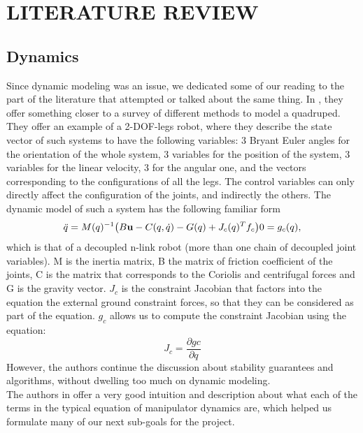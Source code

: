 \section{LITERATURE REVIEW}
\subsection{Dynamics}
Since dynamic modeling was an issue, we dedicated some of our reading to the part of the literature that attempted or talked about the same thing. In \cite{hardt2003dynamic}, they offer something closer to a survey of different methods to model a quadruped. They offer an example of a 2-DOF-legs robot, where they describe the state vector of such systems to have the following variables: 3 Bryant Euler angles for the orientation of the whole system, 3 variables for the position of the system, 3 variables for the linear velocity, 3 for the angular one, and the vectors corresponding to the configurations of all the legs. The control variables can only directly affect the configuration of the joints, and indirectly the others.
The dynamic model of such a system has the following familiar form
$$
\ddot{q} = M(q)^{-1}\big(B\textbf{u} - C(q,\dot{q}) - G(q) + J_c(q)^T f_c\big)
\\
0 = g_c(q),
$$
which is that of a decoupled n-link robot (more than one chain of decoupled joint variables). M is the inertia matrix, B the matrix of friction coefficient of the joints, C is the matrix that corresponds to the Coriolis and centrifugal forces and G is the gravity vector. $J_c$ is the constraint Jacobian that factors into the equation the external ground constraint forces, so that they can be considered as part of the equation. $g_c$ allows us to compute the constraint Jacobian using the equation:
$$
J_c = \frac{\partial gc}{\partial q}
$$
However, the authors continue the discussion about stability guarantees and algorithms, without dwelling too much on dynamic modeling.
\\
The authors in \cite{ferguene2009dynamic} offer a very good intuition and description about what each of the terms in the typical equation of manipulator dynamics are, which helped us formulate many of our next sub-goals for the project.

